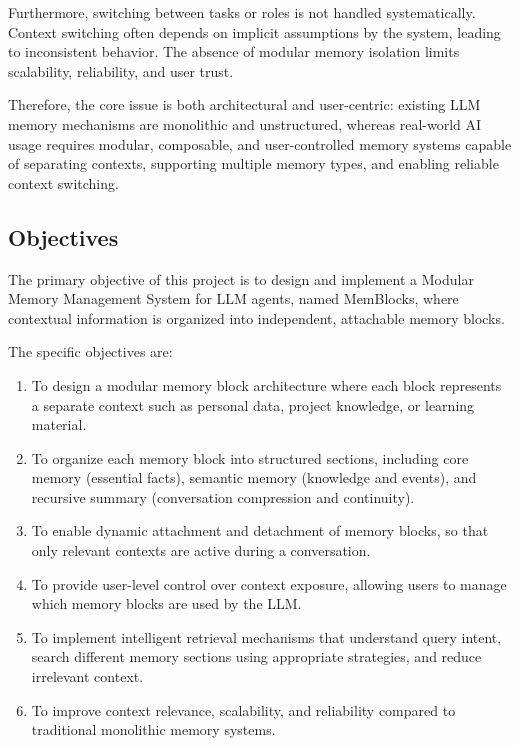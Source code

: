 \documentclass[12pt,a4paper]{article}
\begin{document}
Furthermore, switching between tasks or roles is not handled systematically. Context switching often depends on implicit assumptions by the system, leading to inconsistent behavior. The absence of modular memory isolation limits scalability, reliability, and user trust.

Therefore, the core issue is both architectural and user-centric: existing LLM memory mechanisms are monolithic and unstructured, whereas real-world AI usage requires modular, composable, and user-controlled memory systems capable of separating contexts, supporting multiple memory types, and enabling reliable context switching.

\subsection{Objectives}

The primary objective of this project is to design and implement a Modular Memory Management System for LLM agents, named MemBlocks, where contextual information is organized into independent, attachable memory blocks.

The specific objectives are:

\begin{enumerate}
    \item To design a modular memory block architecture where each block represents a separate context such as personal data, project knowledge, or learning material.
    
    \item To organize each memory block into structured sections, including core memory (essential facts), semantic memory (knowledge and events), and recursive summary (conversation compression and continuity).
    
    \item To enable dynamic attachment and detachment of memory blocks, so that only relevant contexts are active during a conversation.
    
    \item To provide user-level control over context exposure, allowing users to manage which memory blocks are used by the LLM.
    
    \item To implement intelligent retrieval mechanisms that understand query intent, search different memory sections using appropriate strategies, and reduce irrelevant context.
    
    \item To improve context relevance, scalability, and reliability compared to traditional monolithic memory systems.
\end{enumerate}
\end{document}
